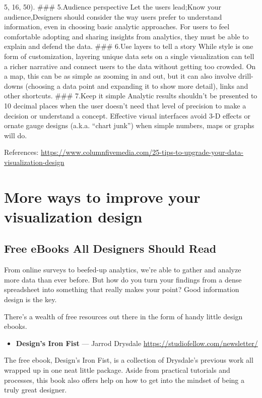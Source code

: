 \documentclass[]{book}
\providecommand{\tightlist}{%
  \setlength{\itemsep}{0pt}\setlength{\parskip}{0pt}}
\theoremstyle{definition}
\theoremstyle{definition}
\theoremstyle{definition}
\theoremstyle{remark}
\begin{document}
5, 16, 50). \#\#\# 5.Audience perspective Let the users lead;Know your
audience,Designers should consider the way users prefer to understand
information, even in choosing basic analytic approaches. For users to
feel comfortable adopting and sharing insights from analytics, they must
be able to explain and defend the data. \#\#\# 6.Use layers to tell a
story While style is one form of customization, layering unique data
sets on a single visualization can tell a richer narrative and connect
users to the data without getting too crowded. On a map, this can be as
simple as zooming in and out, but it can also involve drill-downs
(choosing a data point and expanding it to show more detail), links and
other shortcuts. \#\#\# 7.Keep it simple Analytic results shouldn't be
presented to 10 decimal places when the user doesn't need that level of
precision to make a decision or understand a concept. Effective visual
interfaces avoid 3-D effects or ornate gauge designs (a.k.a. ``chart
junk'') when simple numbers, maps or graphs will do.

References:
\url{https://www.columnfivemedia.com/25-tips-to-upgrade-your-data-visualization-design}

\section{More ways to improve your visualization
design}\label{more-ways-to-improve-your-visualization-design}

\subsection{Free eBooks All Designers Should
Read}\label{free-ebooks-all-designers-should-read}

From online surveys to beefed-up analytics, we're able to gather and
analyze more data than ever before. But how do you turn your findings
from a dense spreadsheet into something that really makes your point?
Good information design is the key.

There's a wealth of free resources out there in the form of handy little
design ebooks.

\begin{itemize}
\tightlist
\item
  \textbf{Design's Iron Fist} --- Jarrod Drysdale
  \url{https://studiofellow.com/newsletter/}
\end{itemize}

The free ebook, Design's Iron Fist, is a collection of Drysdale's
previous work all wrapped up in one neat little package. Aside from
practical tutorials and processes, this book also offers help on how to
get into the mindset of being a truly great designer.
\end{document}
